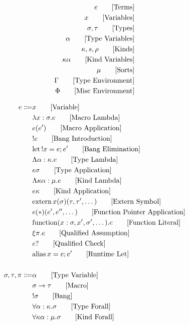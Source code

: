 \documentclass {article}
\begin{document}
\Large

\begin{align*}
e \tag* {[Terms]} \\
x \tag* {[Variables]} \\
\sigma, \tau \tag* {[Types]} \\
\alpha \tag* {[Type Variables]} \\
\kappa, s, \rho \tag* {[Kinds]} \\
\kappa \alpha \tag*{[Kind Variables]} \\
\mu \tag*{[Sorts]} \\
\Gamma \tag* {[Type Environment]} \\
\Phi \tag* {[Misc Environment]}
\end{align*}

\begin{align*}
e \Coloneqq & x \tag*{[Variable]}\\
& \lambda x : \sigma. e \tag*{[Macro Lambda]}\\
& e(e') \tag*{[Macro Application]}\\
& !e \tag*{[Bang Introduction]} \\
& \text{let} \, !x = e; e' \tag*{[Bang Elimination]} \\ 
& \Lambda \alpha : \kappa. e \tag*{[Type Lambda]} \\
& e \sigma \tag*{[Type Application]} \\
& \Lambda \kappa \alpha : \mu. e \tag*{[Kind Lambda]} \\
& e \kappa \tag*{[Kind Application]} \\
& \text{extern} \, x (\sigma) (\tau, \tau', \dots) \tag*{[Extern Symbol]} \\
& e(*)(e',e'',\dots) \tag*{[Function Pointer Application]} \\
& \text{function} (x : \sigma, x', \sigma', \dots). e \tag*{[Function Literal]} \\
& \xi \pi. e \tag*{[Qualified Assumption]} \\
& e? \tag*{[Qualified Check]} \\
& \text{alias} \, x = e; e' \tag*{[Runtime Let]} \\
\\
\sigma, \tau, \pi \Coloneqq & \alpha \tag* {[Type Variable]}\\
& \sigma \to \tau \tag*{[Macro]}\\
& !\sigma \tag*{[Bang]} \\
& \forall \alpha : \kappa. \sigma \tag*{[Type Forall]}\\ 
& \forall \kappa \alpha : \mu. \sigma \tag*{[Kind Forall]}\\

\end{align*}
\end{document}
